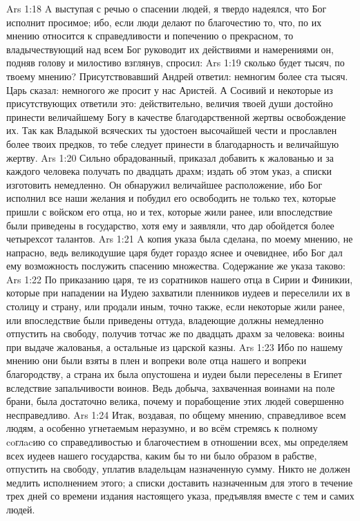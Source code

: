 \vs Ars 1:18
A выступая с речью о спасении людей, я твердо надеялся, что Бог исполнит просимое; ибо, если люди делают по благочестию то, что, по их мнению относится к справедливости и попечению о прекрасном, то владычествующий над всем Бог руководит их действиями и намерениями он, подняв голову и милостиво взглянув, спросил:
\vs Ars 1:19
сколько будет тысяч, по твоему мнению? Присутствовавший Андрей ответил: немногим более ста тысяч. Царь сказал: немногого же просит у нас Аристей. А Сосивий и некоторые из присутствующих ответили это: действительно, величия твоей души достойно принести величайшему Богу в качестве благодарственной жертвы освобождение их. Так как Владыкой всяческих ты удостоен высочайшей чести и прославлен более твоих предков, то тебе следует принести в благодарность и величайшую жертву.
\vs Ars 1:20
Сильно обрадованный, приказал добавить к жалованью и за каждого человека получать по двадцать драхм; издать об этом указ, а списки изготовить немедленно. Он обнаружил величайшее расположение, ибо Бог исполнил все наши желания и побудил его освободить не только тех, которые пришли с войском его отца, но и тех, которые жили ранее, или впоследствие были приведены в государство, хотя ему и заявляли, что дар обойдется более четырехсот талантов.
\vs Ars 1:21
A копия указа была сделана, по моему мнению, не напрасно, ведь великодушие царя будет гораздо яснее и очевиднее, ибо Бог дал ему возможность послужить спасению множества. Содержание же указа таково:
\vs Ars 1:22
По приказанию царя, те из соратников нашего отца в Сирии и Финикии, которые при нападении на Иудею захватили пленников иудеев и переселили их в столицу и страну, или продали иным, точно также, если некоторые жили ранее, или впоследствие были приведены оттуда, владеющие должны немедленно отпустить на свободу, получив тотчас же по двадцать драхм за человека: воины при выдаче жалованья, а остальные из царской казны.
\vs Ars 1:23
Ибо по нашему мнению они были взяты в плен и вопреки воле отца нашего и вопреки благородству, а страна их была опустошена и иудеи были переселены в Египет вследствие запальчивости воинов. Ведь добыча, захваченная воинами на поле брани, была достаточно велика, почему и порабощение этих людей совершенно несправедливо.
\vs Ars 1:24
Итак, воздавая, по общему мнению, справедливое всем людям, а особенно угнетаемым неразумно, и во всём стремясь к полному coглacию со справедливостью и благочестием в отношении всех, мы определяем всех иудеев нашего государства, каким бы то ни было образом в рабстве, отпустить на свободу, уплатив владельцам назначенную сумму. Никто не должен медлить исполнением этого; а списки доставить назначенным для этого в течение трех дней со времени издания настоящего указа, предъявляя вместе с тем и самих людей.

